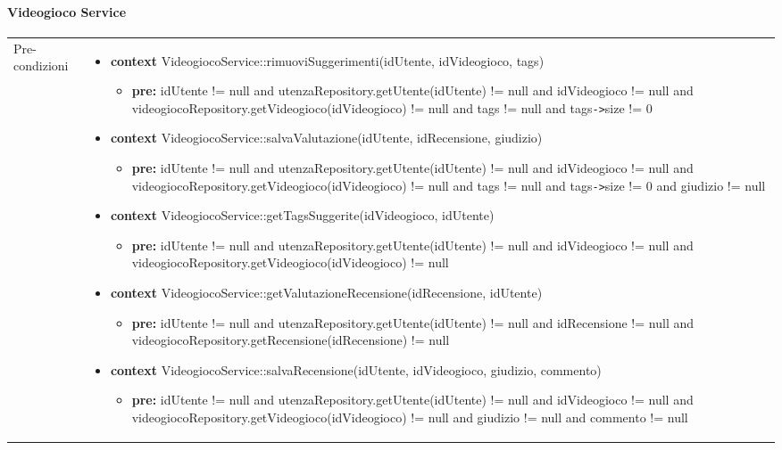 \paragraph{Videogioco Service}
\small\begin{tabular}{|| l | p{28em} ||} 
	\hline
	Pre-condizioni & \begin{itemize}[leftmargin=*]
		\item \textbf{context} VideogiocoService::rimuoviSuggerimenti(idUtente, idVideogioco, tags)
		\begin{itemize}
			\item[ ] \textbf{pre:} idUtente != null and utenzaRepository.getUtente(idUtente) != null and idVideogioco != null and videogiocoRepository.getVideogioco(idVideogioco) != null and tags != null and tags\verb|->|size != 0
		\end{itemize}

		\item \textbf{context} VideogiocoService::salvaValutazione(idUtente, idRecensione, giudizio)
		\begin{itemize}
			\item[ ] \textbf{pre:} idUtente != null and utenzaRepository.getUtente(idUtente) != null and idVideogioco != null and videogiocoRepository.getVideogioco(idVideogioco) != null and tags != null and tags\verb|->|size != 0 and giudizio != null
		\end{itemize}

		\item \textbf{context} VideogiocoService::getTagsSuggerite(idVideogioco, idUtente)
		\begin{itemize}
			\item[ ] \textbf{pre:} idUtente != null and utenzaRepository.getUtente(idUtente) != null and idVideogioco != null and videogiocoRepository.getVideogioco(idVideogioco) != null
		\end{itemize}

		\item \textbf{context} VideogiocoService::getValutazioneRecensione(idRecensione, idUtente)
		\begin{itemize}
			\item[ ] \textbf{pre:} idUtente != null and utenzaRepository.getUtente(idUtente) != null and idRecensione != null and videogiocoRepository.getRecensione(idRecensione) != null
		\end{itemize}

		\item \textbf{context} VideogiocoService::salvaRecensione(idUtente, idVideogioco, giudizio, commento)
		\begin{itemize}
			\item[ ] \textbf{pre:} idUtente != null and utenzaRepository.getUtente(idUtente) != null and idVideogioco != null and videogiocoRepository.getVideogioco(idVideogioco) != null and giudizio != null and commento != null
		\end{itemize}


\end{itemize}
\end{tabular}
